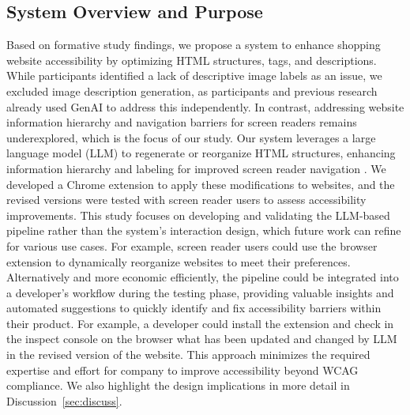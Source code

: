 


\subsection{System Overview and Purpose}
Based on formative study findings, we propose a system to enhance shopping website accessibility by optimizing HTML structures, tags, and descriptions. While participants identified a lack of descriptive image labels as an issue, we excluded image description generation, as participants and previous research already used GenAI to address this independently\cite{10.1145/3234695.3236337, huh2023genassist}. In contrast, addressing website information hierarchy and navigation barriers for screen readers remains underexplored, which is the focus of our study.
Our system leverages a large language model (LLM) to regenerate or reorganize HTML structures, enhancing information hierarchy and labeling for improved screen reader navigation \cite{llmhtml_gur2022understanding}. 
We developed a Chrome extension to apply these modifications to websites, and the revised versions were tested with screen reader users to assess accessibility improvements. This study focuses on developing and validating the LLM-based pipeline rather than the system's interaction design, which future work can refine for various use cases. For example, screen reader users could use the browser extension to dynamically reorganize websites to meet their preferences. Alternatively and more economic efficiently,  the pipeline
could be integrated into a developer’s workflow during the testing phase, providing valuable insights and automated
suggestions to quickly identify and fix accessibility barriers within their product. For example, a developer could install the extension and check in the inspect console on the browser what has been updated and changed by LLM in the
revised version of the website. This approach minimizes the required expertise and effort for company to improve accessibility beyond WCAG compliance. We also highlight the design implications in more detail in Discussion~\ref{sec:discuss}.


